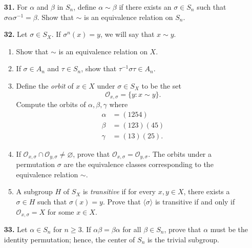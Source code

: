 \documentclass[12pt,reqno]{amsart}
\renewcommand{\emptyset}{\ensuremath{\varnothing}}
\newcommand{\boldemph}{\emph}
\newcommand{\probskip}{\vskip8cm}
\begin{document}
\begin{enumerate}[{\bf 1.}]
\probskip

 
\item[{\bf 31.}]  %
For $\alpha$ and $\beta$ in $S_n$, define $\alpha \sim \beta$ if there
exists an $\sigma \in S_n$ such that 
$\sigma \alpha \sigma^{-1} = \beta$.  Show that $\sim$ is an equivalence
relation on $S_n$. 
 

 
\newpage 
\item[{\bf 32.}]  %
Let $\sigma \in S_X$. If $\sigma^n(x) = y$, we will say that 
$x \sim y$. 
\begin{enumerate}
 
 \item
Show that $\sim$ is an equivalence relation on $X$.
 
 \item
If $\sigma \in A_n$ and $\tau \in S_n$, show that 
$\tau^{-1} \sigma \tau \in A_n$. 
 
\item
Define the \boldemph{orbit} of $x \in X$ under $\sigma \in S_X$ to
be the set  
\[
{\mathcal O}_{x, \sigma} = \{ y : x \sim y  \}.
\]
Compute the orbits of $\alpha, \beta, \gamma$ where
\begin{align*}
\alpha & = (1254) \\
\beta & = (123)(45)\\
\gamma & = (13)(25).
\end{align*}
 
 \item
If ${\mathcal O}_{x, \sigma} \cap {\mathcal O}_{y, \sigma} \neq \emptyset$,
prove that ${\mathcal O}_{x, \sigma} = {\mathcal O}_{y, \sigma}$.  The orbits
under a permutation $\sigma$ are the equivalence classes corresponding
to the equivalence relation $\sim$.
 
 
\item
A subgroup $H$ of $S_X$ is \boldemph{
transitive} if for every $x, y \in X$, 
there exists a $\sigma \in H$ such that $\sigma(x) =y$. Prove that
$\langle \sigma \rangle$ is transitive if and only if 
${\mathcal O}_{x, \sigma} = X$ for some $x \in X$. 
 
 
\end{enumerate}
 
\newpage
 
 
\item[{\bf 33.}]  %
Let $\alpha \in S_n$ for $n \geq 3$. If $\alpha \beta = \beta \alpha$
for all $\beta \in S_n$, prove that $\alpha$ must be the identity
permutation; hence, the center of $S_n$ is the trivial subgroup. 
 
 
\end{enumerate}
\end{document}
